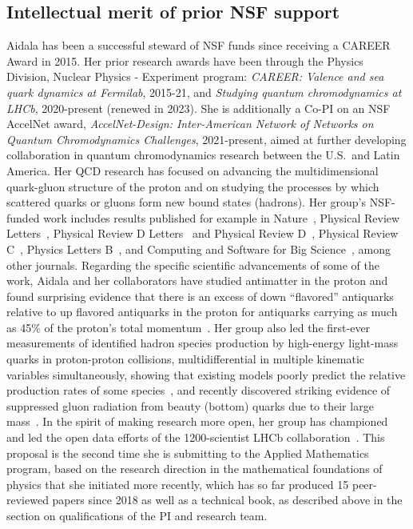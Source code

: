 \subsection{Intellectual merit of prior NSF support}

Aidala has been a successful steward of NSF funds since receiving a CAREER Award in 2015.  Her prior research awards have been through the Physics Division, Nuclear Physics - Experiment program: \emph{CAREER: Valence and sea quark dynamics at Fermilab}, 2015-21, and \emph{Studying quantum chromodynamics at LHCb}, 2020-present (renewed in 2023).  She is additionally a Co-PI on an NSF AccelNet award, \emph{AccelNet-Design: Inter-American Network of Networks on Quantum Chromodynamics Challenges}, 2021-present, aimed at further developing collaboration in quantum chromodynamics research between the U.S.~and Latin America.  Her QCD research has focused on advancing the multidimensional quark-gluon structure of the proton and on studying the processes by which scattered quarks or gluons form new bound states (hadrons).  Her group's NSF-funded work includes results published for example in Nature~\cite{SeaQuest:2021zxb}, Physical Review Letters~\cite{LHCb:2022tbc,LHCb:2019qoc}, Physical Review D Letters~\cite{LHCb:2022rky} and Physical Review D~\cite{LHCb:2025mcq}, Physical Review C~\cite{SeaQuest:2022xdu}, Physics Letters B~\cite{LHCb:2025tvf}, and Computing and Software for Big Science~\cite{Aidala:2023dai}, among other journals.  Regarding the specific scientific advancements of some of the work, Aidala and her collaborators have studied antimatter in the proton and found surprising evidence that there is an excess of down ``flavored'' antiquarks relative to up flavored antiquarks in the proton for antiquarks carrying as much as 45\% of the proton's total momentum~\cite{SeaQuest:2021zxb,SeaQuest:2022xdu}.  Her group also led the first-ever measurements of identified hadron species production by high-energy light-mass quarks in proton-proton collisions, multidifferential in multiple kinematic variables simultaneously, showing that existing models poorly predict the relative production rates of some species~\cite{LHCb:2022rky}, and recently discovered striking evidence of suppressed gluon radiation from beauty (bottom) quarks due to their large mass~\cite{LHCb:2025mcq}. In the spirit of making research more open, her group has championed and led the open data efforts of the 1200-scientist LHCb collaboration~\cite{Aidala:2023dai}.  This proposal is the second time she is submitting to the Applied Mathematics program, based on the research direction in the mathematical foundations of physics that she initiated more recently, which has so far produced 15 peer-reviewed papers since 2018 as well as a technical book, as described above in the section on qualifications of the PI and research team.  \\

